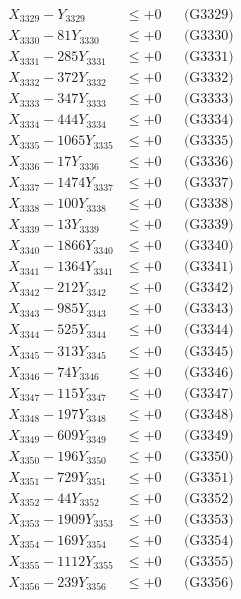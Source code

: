 \documentclass[a4paper,10pt]{article}
\begin{document}
{\begin{align}
X_{3329} - Y_{3329} &\leq +0 && \text{(G3329)} \\
X_{3330} - 81Y_{3330} &\leq +0 && \text{(G3330)} \\
\allowbreak
X_{3331} - 285Y_{3331} &\leq +0 && \text{(G3331)} \\
X_{3332} - 372Y_{3332} &\leq +0 && \text{(G3332)} \\
X_{3333} - 347Y_{3333} &\leq +0 && \text{(G3333)} \\
X_{3334} - 444Y_{3334} &\leq +0 && \text{(G3334)} \\
X_{3335} - 1065Y_{3335} &\leq +0 && \text{(G3335)} \\
X_{3336} - 17Y_{3336} &\leq +0 && \text{(G3336)} \\
X_{3337} - 1474Y_{3337} &\leq +0 && \text{(G3337)} \\
X_{3338} - 100Y_{3338} &\leq +0 && \text{(G3338)} \\
X_{3339} - 13Y_{3339} &\leq +0 && \text{(G3339)} \\
X_{3340} - 1866Y_{3340} &\leq +0 && \text{(G3340)} \\
\allowbreak
X_{3341} - 1364Y_{3341} &\leq +0 && \text{(G3341)} \\
X_{3342} - 212Y_{3342} &\leq +0 && \text{(G3342)} \\
X_{3343} - 985Y_{3343} &\leq +0 && \text{(G3343)} \\
X_{3344} - 525Y_{3344} &\leq +0 && \text{(G3344)} \\
X_{3345} - 313Y_{3345} &\leq +0 && \text{(G3345)} \\
X_{3346} - 74Y_{3346} &\leq +0 && \text{(G3346)} \\
X_{3347} - 115Y_{3347} &\leq +0 && \text{(G3347)} \\
X_{3348} - 197Y_{3348} &\leq +0 && \text{(G3348)} \\
X_{3349} - 609Y_{3349} &\leq +0 && \text{(G3349)} \\
X_{3350} - 196Y_{3350} &\leq +0 && \text{(G3350)} \\
\allowbreak
X_{3351} - 729Y_{3351} &\leq +0 && \text{(G3351)} \\
X_{3352} - 44Y_{3352} &\leq +0 && \text{(G3352)} \\
X_{3353} - 1909Y_{3353} &\leq +0 && \text{(G3353)} \\
X_{3354} - 169Y_{3354} &\leq +0 && \text{(G3354)} \\
X_{3355} - 1112Y_{3355} &\leq +0 && \text{(G3355)} \\
X_{3356} - 239Y_{3356} &\leq +0 && \text{(G3356)} \\

\end{align}}
\end{document}
